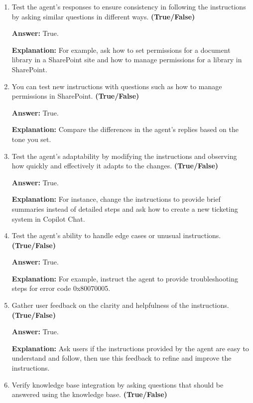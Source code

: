 \documentclass[10pt]{article}
\begin{document}
\begin{enumerate}[leftmargin=*]
\textbf{Explanation:} Test the agent's responses to see if it follows the instructions correctly, such as providing step-by-step guidance when asked how to create a new ticketing system in Microsoft 365 Copilot Chat.

\item Test the agent's responses to ensure consistency in following the instructions by asking similar questions in different ways. \textbf{(True/False)}

\textbf{Answer:} True.

\textbf{Explanation:} For example, ask how to set permissions for a document library in a SharePoint site and how to manage permissions for a library in SharePoint.

\item You can test new instructions with questions such as how to manage permissions in SharePoint. \textbf{(True/False)}

\textbf{Answer:} True.

\textbf{Explanation:} Compare the differences in the agent's replies based on the tone you set.

\item Test the agent's adaptability by modifying the instructions and observing how quickly and effectively it adapts to the changes. \textbf{(True/False)}

\textbf{Answer:} True.

\textbf{Explanation:} For instance, change the instructions to provide brief summaries instead of detailed steps and ask how to create a new ticketing system in Copilot Chat.

\item Test the agent's ability to handle edge cases or unusual instructions. \textbf{(True/False)}

\textbf{Answer:} True.

\textbf{Explanation:} For example, instruct the agent to provide troubleshooting steps for error code 0x80070005.

\item Gather user feedback on the clarity and helpfulness of the instructions. \textbf{(True/False)}

\textbf{Answer:} True.

\textbf{Explanation:} Ask users if the instructions provided by the agent are easy to understand and follow, then use this feedback to refine and improve the instructions.

\item Verify knowledge base integration by asking questions that should be answered using the knowledge base. \textbf{(True/False)}


\end{enumerate}
\end{document}
